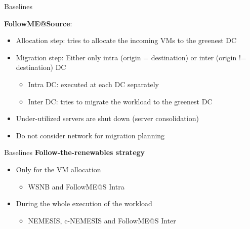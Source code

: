 \documentclass[Ligatures=TeX,table,svgnames,usetotalslideindicator,compress,10pt,aspectratio=169]{beamer}
\begin{document}
\begin{frame}{Baselines}

  \alert{\textbf{FollowME@Source}}:

  \begin{itemize}
  \item Allocation step: tries to allocate the incoming VMs to the
    greenest DC

  \item Migration step: Either only intra (origin = destination) or
    inter (origin != destination) DC

    \begin{itemize}
    \item Intra DC: executed at each DC separately
    \item Inter DC: tries to migrate the workload to the greenest DC
    \end{itemize}       
  \item Under-utilized servers are shut down (server consolidation)
  \item Do not consider network for migration planning

  \end{itemize}    
\end{frame}


\begin{frame}{Baselines}
  \textbf{Follow-the-renewables strategy}
  \begin{itemize}
  \item Only for the VM allocation
    \begin{itemize}
    \item WSNB and FollowME@S Intra
    \end{itemize}  
  \item During the whole execution of the workload
    \begin{itemize}
    \item NEMESIS, c-NEMESIS and FollowME@S Inter
    \end{itemize}  
  \end{itemize}    
\end{frame}
\end{document}
